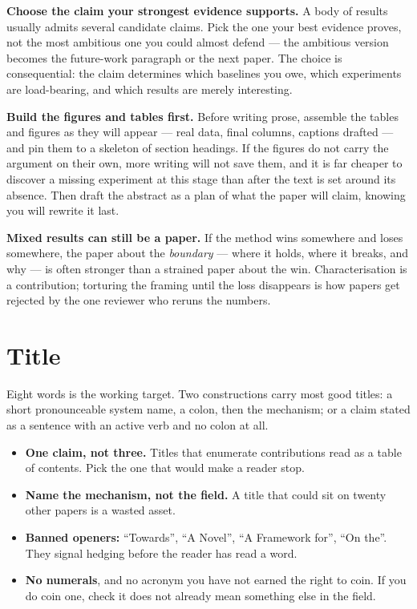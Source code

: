 \documentclass[11pt,a4paper]{article}
\newcommand{\lead}[1]{\medskip\noindent\textbf{#1}\quad}
\begin{document}
\lead{Choose the claim your strongest evidence supports.} A body of results
usually admits several candidate claims. Pick the one your best evidence
proves, not the most ambitious one you could almost defend --- the ambitious
version becomes the future-work paragraph or the next paper. The choice is
consequential: the claim determines which baselines you owe, which
experiments are load-bearing, and which results are merely interesting.

\lead{Build the figures and tables first.} Before writing prose, assemble
the tables and figures as they will appear --- real data, final columns,
captions drafted --- and pin them to a skeleton of section headings. If the
figures do not carry the argument on their own, more writing will not save
them, and it is far cheaper to discover a missing experiment at this stage
than after the text is set around its absence. Then draft the abstract as a
plan of what the paper will claim, knowing you will rewrite it last.

\lead{Mixed results can still be a paper.} If the method wins somewhere and
loses somewhere, the paper about the \emph{boundary} --- where it holds,
where it breaks, and why --- is often stronger than a strained paper about
the win. Characterisation is a contribution; torturing the framing until the
loss disappears is how papers get rejected by the one reviewer who reruns
the numbers.

\section{Title}

Eight words is the working target. Two constructions carry most good titles:
a short pronounceable system name, a colon, then the mechanism; or a claim
stated as a sentence with an active verb and no colon at all.

\begin{itemize}
  \item \textbf{One claim, not three.} Titles that enumerate contributions
    read as a table of contents. Pick the one that would make a reader stop.
  \item \textbf{Name the mechanism, not the field.} A title that could sit on
    twenty other papers is a wasted asset.
  \item \textbf{Banned openers:} ``Towards'', ``A Novel'', ``A Framework
    for'', ``On the''. They signal hedging before the reader has read a word.
  \item \textbf{No numerals}, and no acronym you have not earned the right to
    coin. If you do coin one, check it does not already mean something else in
    the field.
\end{itemize}
\end{document}
